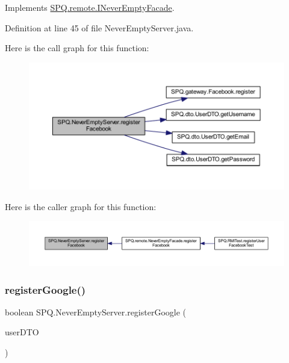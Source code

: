 Implements \mbox{\hyperlink{interface_s_p_q_1_1remote_1_1_i_never_empty_facade_a7b2f025522489fe9070d09a4fb08f0a1}{S\+P\+Q.\+remote.\+I\+Never\+Empty\+Facade}}.



Definition at line 45 of file Never\+Empty\+Server.\+java.

Here is the call graph for this function\+:
\nopagebreak
\begin{figure}[H]
\begin{center}
\leavevmode
\includegraphics[width=350pt]{class_s_p_q_1_1_never_empty_server_abf7e271e0edb91e8f8ed73063de74b03_cgraph}
\end{center}
\end{figure}
Here is the caller graph for this function\+:
\nopagebreak
\begin{figure}[H]
\begin{center}
\leavevmode
\includegraphics[width=350pt]{class_s_p_q_1_1_never_empty_server_abf7e271e0edb91e8f8ed73063de74b03_icgraph}
\end{center}
\end{figure}
\mbox{\label{class_s_p_q_1_1_never_empty_server_ac97355451c02fc378cb5d8f33f442ce6}} 
\subsubsection{\texorpdfstring{register\+Google()}{registerGoogle()}}
{\footnotesize\ttfamily boolean S\+P\+Q.\+Never\+Empty\+Server.\+register\+Google (\begin{DoxyParamCaption}\item[{\mbox{\hyperlink{class_s_p_q_1_1dto_1_1_user_d_t_o}{User\+D\+TO}}}]{user\+D\+TO }\end{DoxyParamCaption})}



